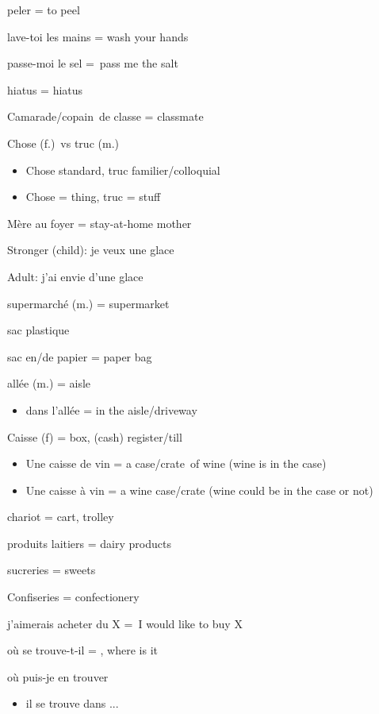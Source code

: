 peler = to peel

lave-toi les mains = wash your hands

passe-moi le sel =~pass me the salt

hiatus = hiatus

Camarade/copain~de classe = classmate

Chose (f.)~vs truc (m.)

\begin{itemize}
\item
  Chose standard, truc familier/colloquial~
\item
  Chose = thing, truc = stuff
\end{itemize}

Mère au foyer = stay-at-home mother~

Stronger (child): je veux une glace~

Adult: j'ai envie d'une glace~

supermarché (m.) = supermarket

sac plastique

sac en/de papier = paper bag

allée (m.) = aisle

\begin{itemize}
\item
  dans l'allée = in the aisle/driveway
\end{itemize}

{Caisse (f) = box, (cash) register/till}

\begin{itemize}
\item
  {Une caisse de vin = a case/crate~of wine (wine is in the case)}
\item
  {Une caisse à vin = a wine case/crate (wine could be in the case or
  not)}
\end{itemize}

{chariot = cart, trolley}

{produits laitiers = dairy products}

{sucreries = sweets}

{Confiseries = confectionery~}

{j'aimerais acheter du X =~}{I would like to buy X}

{où se trouve-t-il = , where is it}

{où puis-je en trouver}

\begin{itemize}
\item
  {il se trouve dans ...}
\end{itemize}

